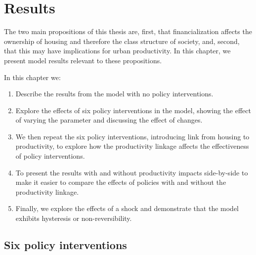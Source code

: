\chapter{Results} \label{chapter-results}

The two main propositions of this thesis are, first, that financialization affects the ownership of housing and therefore the class structure of society, and, second, that this may have implications for urban productivity.  In this chapter, we present model results relevant to these propositions.

In this chapter we:
\begin{enumerate}
    \item %
    Describe the results from the model with no policy interventions. 
    \item Explore the effects of six policy interventions in the model, %
    showing the  effect of varying the parameter and discussing the effect of changes. 
    \item %
    We then repeat the six policy interventions, introducing link from housing to productivity, to explore how the productivity linkage affects the effectiveness of policy interventions. %
    \item %
     To present the results with and without productivity impacts side-by-side to make it easier to compare the effects of policies with and without the productivity linkage. 
     \item Finally, we explore the effects of a shock %
     and demonstrate that the model exhibits \gls{hysteresis} or non-reversibility.
     
\end{enumerate}


\section{Six policy interventions}

